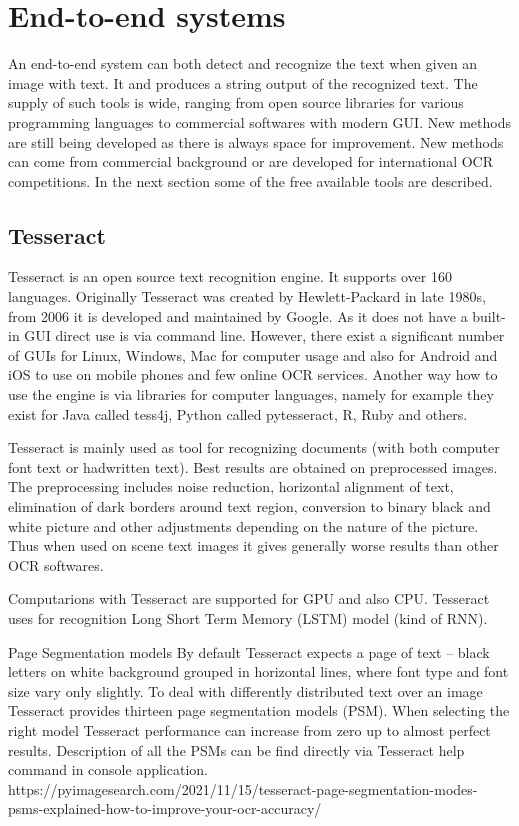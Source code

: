 \section{End-to-end systems}

An end-to-end system can both detect and recognize the text when given an image with text. It and produces a string output of the recognized text. The supply of such tools is wide, ranging from open source libraries for various programming languages to commercial softwares with modern GUI. New methods are still being developed as there is always space for improvement. New methods can come from commercial background or are developed for international OCR competitions. In the next section some of the free available tools are described.

\subsection{Tesseract}

Tesseract is an open source text recognition engine. It supports over 160 languages. Originally Tesseract was created by Hewlett-Packard in late 1980s, from 2006 it is developed and maintained by Google. As it does not have a built-in GUI direct use is via command line. However, there exist a significant number of GUIs for Linux, Windows, Mac for computer usage and also for Android and iOS to use on mobile phones and few online OCR services. Another way how to use the engine is via libraries for computer languages, namely for example they exist for Java called tess4j, Python called pytesseract, R, Ruby and others. \cite{tesseract1}

Tesseract is mainly used as tool for recognizing documents (with both computer font text or hadwritten text). Best results are obtained on preprocessed images. The preprocessing includes noise reduction, horizontal alignment of text, elimination of dark borders around text region, conversion to binary black and white picture and other adjustments depending on the nature of the picture. Thus when used on scene text images it gives generally worse results than other OCR softwares. 

Computarions with Tesseract are supported for GPU and also CPU. Tesseract uses for recognition Long Short Term Memory (LSTM) model (kind of RNN).

Page Segmentation models
By default Tesseract expects a page of text -- black letters on white background grouped in horizontal lines, where font type and font size vary only slightly. To deal with differently distributed text over an image Tesseract provides thirteen page segmentation models (PSM). When selecting the right model Tesseract performance can increase from zero up to almost perfect results. Description of all the PSMs can be find directly via Tesseract help command in console application. 
https://pyimagesearch.com/2021/11/15/tesseract-page-segmentation-modes-psms-explained-how-to-improve-your-ocr-accuracy/


